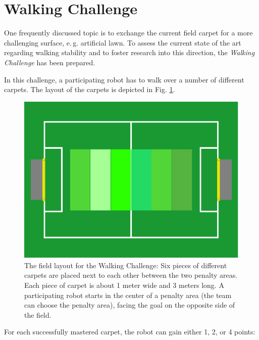 \documentclass[12pt]{article}
\newcommand{\eg}{\mbox{e.\,g.}\xspace}
\begin{document}
\newpage






\section{Walking Challenge}

One frequently discussed topic is to exchange the current field carpet for a more challenging surface, \eg artificial lawn.
To assess the current state of the art regarding walking stability and to foster research into this direction, the \textit{Walking Challenge} has been prepared.

In this challenge, a participating robot has to walk over a number of different carpets. The layout of the carpets is depicted in Fig. \ref{fig:walking_challenge}.

\begin{figure}[th!]
\centerline{\includegraphics[width=0.6\columnwidth]{figures/walking-challenge}}
\caption{The field layout for the Walking Challenge: Six pieces of different carpets are placed next to each other between the two penalty areas. Each piece of carpet is about 1 meter wide and 3 meters long. A participating robot starts in the center of a penalty area (the team can choose the penalty area), facing the goal on the opposite side of the field.}
\label{fig:walking_challenge}
\end{figure}

For each successfully mastered carpet, the robot can gain either 1, 2, or 4 points: 
\end{document}
